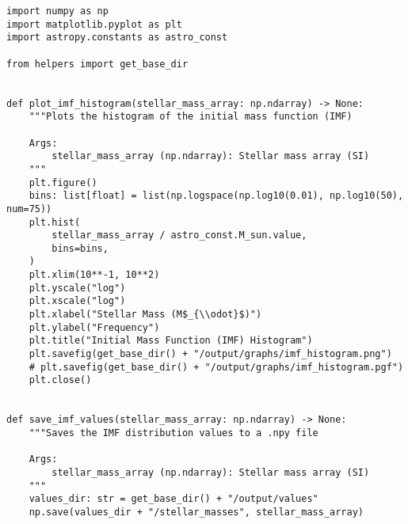 \begin{lstlisting}
import numpy as np
import matplotlib.pyplot as plt
import astropy.constants as astro_const

from helpers import get_base_dir


def plot_imf_histogram(stellar_mass_array: np.ndarray) -> None:
    """Plots the histogram of the initial mass function (IMF)

    Args:
        stellar_mass_array (np.ndarray): Stellar mass array (SI)
    """
    plt.figure()
    bins: list[float] = list(np.logspace(np.log10(0.01), np.log10(50), num=75))
    plt.hist(
        stellar_mass_array / astro_const.M_sun.value,
        bins=bins,
    )
    plt.xlim(10**-1, 10**2)
    plt.yscale("log")
    plt.xscale("log")
    plt.xlabel("Stellar Mass (M$_{\\odot}$)")
    plt.ylabel("Frequency")
    plt.title("Initial Mass Function (IMF) Histogram")
    plt.savefig(get_base_dir() + "/output/graphs/imf_histogram.png")
    # plt.savefig(get_base_dir() + "/output/graphs/imf_histogram.pgf")
    plt.close()


def save_imf_values(stellar_mass_array: np.ndarray) -> None:
    """Saves the IMF distribution values to a .npy file

    Args:
        stellar_mass_array (np.ndarray): Stellar mass array (SI)
    """
    values_dir: str = get_base_dir() + "/output/values"
    np.save(values_dir + "/stellar_masses", stellar_mass_array)
\end{lstlisting}